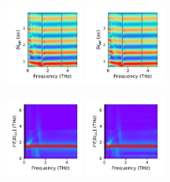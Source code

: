 \documentclass[a4paper]{article}
\begin{document}
\begin{figure}[H]
  \centering
  \includegraphics[width=0.23\textwidth]{cond_pcolor-A0-v0-imp3.pdf}
  \includegraphics[width=0.23\textwidth]{cond_pcolor-A0-v0-imp4.pdf}
\end{figure}
\begin{figure}[H]
  \centering
  \includegraphics[width=0.23\textwidth]{cond_w_pcolor-A0-v0-imp3.pdf}
  \includegraphics[width=0.23\textwidth]{cond_w_pcolor-A0-v0-imp4.pdf}
\end{figure}
\end{document}
